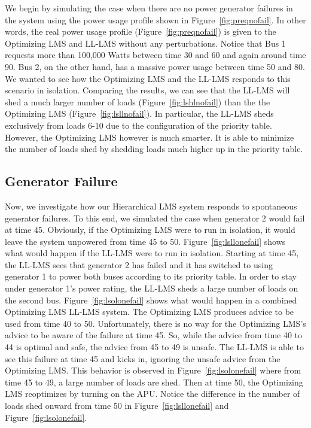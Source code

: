 \documentclass{acm_proc_article-sp}
\begin{document}
We begin by simulating the case when there are no power
generator failures in the system using the power usage profile shown in
Figure~\ref{fig:preqnofail}. 
In other words, the real power usage profile (Figure~\ref{fig:preqnofail}) is given to the Optimizing LMS and LL-LMS without any perturbations.
Notice that Bus 1 requests more than 100,000 Watts
between time 30 and 60 and again around time 90. Bus 2, on the other hand,
has a massive power usage between time 50 and 80. We wanted to see how the
Optimizing LMS and the LL-LMS responds to this scenario in isolation. 
Comparing the results, we can see that the LL-LMS will shed a much larger
number of loads (Figure~\ref{fig:lshlnofail}) than the the Optimizing LMS (Figure~\ref{fig:lsllnofail}). 
In particular, the LL-LMS sheds exclusively from loads 6-10 due to the configuration of the priority table.
However, the Optimizing LMS however is much smarter. 
It is able to minimize the number of loads shed by shedding loads much higher up in the priority table.

\subsection{Generator Failure}
Now, we investigate how our Hierarchical LMS system responds to spontaneous generator failures. 
To this end, we
simulated the case when generator 2 would fail at time 45. Obviously, if the Optimizing LMS were
to run in isolation, it would leave the system unpowered from time 45 to 50. 
Figure~\ref{fig:lsllonefail} shows what would happen if the LL-LMS were to run in 
isolation. Starting at time 45, the LL-LMS sees that generator 2 has failed and it has 
switched to using generator 1 to power both buses according to its priority table. In order
to stay under generator 1's power rating, the LL-LMS sheds a large number of loads on the 
second bus. Figure~\ref{fig:lsolonefail} shows what would happen in a combined Optimizing LMS
LL-LMS system. The Optimizing LMS produces advice to be used from time 40 to 50. Unfortunately,
there is no way for the Optimizing LMS's advice to be aware of the failure at time 45. So, while the advice
from time 40 to 44 is optimal and safe, the advice from 45 to 49 is unsafe. The LL-LMS is
able to see this failure at time 45 and kicks in, ignoring the unsafe advice from the Optimizing LMS. This
behavior is observed in Figure~\ref{fig:lsolonefail} where from time 45 to 49, a large
number of loads are shed. Then at time 50, the Optimizing LMS reoptimizes by turning on the APU.
Notice the difference in the number of loads shed onward from time 50 in 
Figure~\ref{fig:lsllonefail} and Figure~\ref{fig:lsolonefail}.
\end{document}

